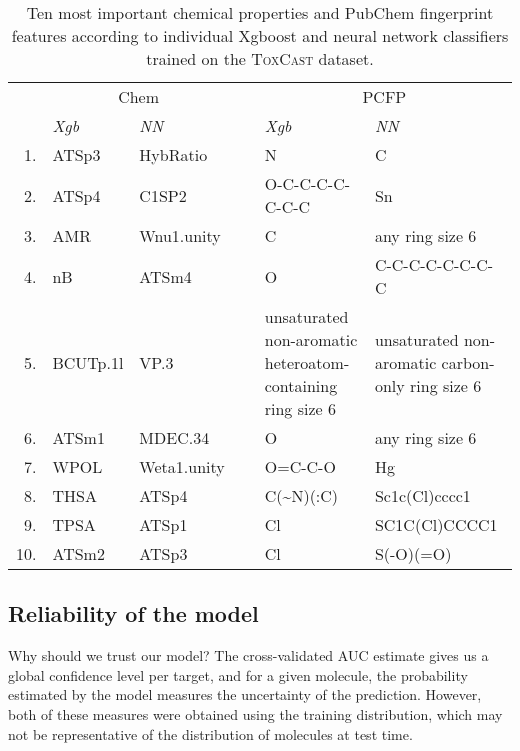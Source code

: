 \documentclass[11pt,a4paper]{article}
\begin{document}
\begin{table}[ht]\small
    \centering
        \begin{tabular}{rp{1.5cm}p{1.5cm}cp{5.1cm}p{5.1cm}}
      \toprule
       ~& \multicolumn{2}{c}{Chem}  & ~ & \multicolumn{2}{c}{PCFP}  \\ 
        \cmidrule(lr){2-3}
        \cmidrule(lr){5-6}
        ~&\multicolumn{1}{l}{\it Xgb} & \multicolumn{1}{l}{\it NN} & ~ & \multicolumn{1}{l}{\it Xgb} & \multicolumn{1}{l}{\it NN} \\ 
      \midrule
      1.& ATSp3 &    HybRatio & ~ &    { N} &   C \\ 
      2.& ATSp4 &    C1SP2 &  ~ &      O-C-C-C-C-C-C-C &   Sn \\ 
      3.& AMR &      Wnu1.unity & ~ &   C &    any ring size 6 \\ 
      4.& nB &       ATSm4 & ~ &        O &   C-C-C-C-C-C-C-C \\ 
      5.& BCUTp.1l & VP.3  & ~ &        unsaturated non-aromatic heteroatom-containing ring size 6 &   
                                         unsaturated non-aromatic carbon-only ring size 6 \\ 
      6.& ATSm1 &    MDEC.34 &  ~ &     O &   any ring size 6 \\ 
      7.& WPOL &     Weta1.unity & ~ & O=C-C-O &    Hg \\ 
      8.& THSA &     ATSp4 &~ &        C(\~{}N)(:C) &  Sc1c(Cl)cccc1 \\ 
      9.& TPSA &     ATSp1 &~ &         Cl &  SC1C(Cl)CCCC1 \\ 
      10.& ATSm2 &   ATSp3 & ~ &        Cl &  S(-O)(=O) \\ 
    \bottomrule
    \end{tabular}
    \caption{Ten most important chemical properties and PubChem fingerprint features according 
    to individual Xgboost and neural network classifiers trained on the 
    \textsc{ToxCast} dataset.} 
    \label{tab_toxcast_top10_features}
    \end{table}


\subsection{Reliability of the model}
Why should we trust our model? The cross-validated AUC estimate gives us a global confidence level 
per target, and for a given molecule, the probability estimated by the model measures the 
uncertainty of the prediction. However, both of these measures were obtained using the training 
distribution, which may not be representative of the distribution of molecules at test time.
\end{document}
